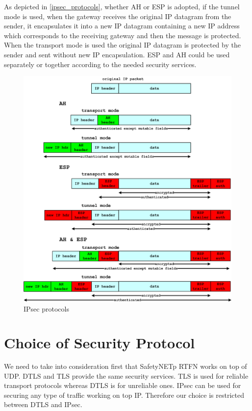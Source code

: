  As depicted in \autoref{ipsec_protocols}, whether \ac{AH} or \ac{ESP} is adopted, if the tunnel mode is used, when the gateway receives the original \ac{IP} datagram from the sender,
 it encapsulates it into a new \ac{IP} datagram containing a new \ac{IP} address which corresponds to the receiving gateway and then the message is protected. When the transport mode is used the original \ac{IP} datagram is protected by the sender and sent without new \ac{IP} encapsulation.
 \ac{ESP} and \ac{AH} could be used separately or together according to the needed security services.


 \begin{figure}[!htbp]
 \centering
 \includegraphics[width=16cm]{figures/IPsec/ipsec_protocols.png}
 \caption{IPsec protocols}\label{ipsec_protocols}
 \end{figure}

\section{Choice of Security Protocol}

We need to take into consideration first that SafetyNETp \ac{RTFN} works on top of \ac{UDP}.
\ac{DTLS} and \ac{TLS} provide the same security services. \ac{TLS} is used for reliable transport protocols whereas DTLS
is for unreliable ones. \ac{IPsec} can be used for securing any type of traffic working on top \ac{IP}.
Therefore our choice is restricted between \ac{DTLS} and \ac{IPsec}.

